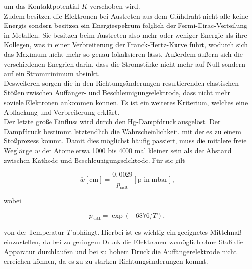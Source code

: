 um das Kontaktpotential $K$ verschoben wird.\\
Zudem besitzen die Elektronen bei Austreten aus dem Glühdraht nicht alle keine Energie sondern besitzen ein Energiespekrum folglich der Fermi-Dirac-Verteilung in Metallen.
Sie besitzen beim Austreten also mehr oder weniger Energie als ihre Kollegen, was in einer Verbreiterung der Franck-Hertz-Kurve führt, wodurch sich das Maximum nicht mehr so genau lokalisieren lässt.
Außerdem äußern sich die verschiedenen Enegrien darin, dass die Stromstärke nicht mehr auf Null sondern auf ein Stromminimum absinkt.\\
Desweiteren sorgen die in den Richtungsänderungen resultierenden elastischen Stößen zwischen Auffänger- und Beschleunigungselektrode, dass nicht mehr soviele Elektronen ankommen können.
Es ist ein weiteres Kriterium, welches eine Abflachung und Verbreiterung erklärt.\\
Der letzte große Einfluss wird durch den Hg-Dampfdruck ausgelöst.
Der Dampfdruck bestimmt letztendlich die Wahrscheinlichkeit, mit der es zu einem Stoßprozess kommt.
Damit dies möglichst häufig passiert, muss die mittlere freie Weglänge $\overline{w}$ der Atome etwa 1000 bis 4000 mal kleiner sein als der Abstand zwischen Kathode und Beschleunigungselektode.
Für sie gilt

\begin{equation}
  \overline{w} [\text{cm}] = \frac{0,0029}{p_{\text{sätt}}} [\text{p in mbar}] \label{eqn:7},
\end{equation}

wobei

\begin{equation}
  p_{\text{sätt}} = \exp(-6876/T) \label{eqn:8},
\end{equation}

von der Temperatur $T$ abhängt.
Hierbei ist es wichtig ein geeignetes Mittelmaß einzustellen, da bei zu geringem Druck die Elektronen womöglich ohne Stoß die Apparatur durchlaufen und bei zu hohem Druck die Auffängerelektrode nicht erreichen können, da es zu zu starken Richtungsänderungen kommt.








